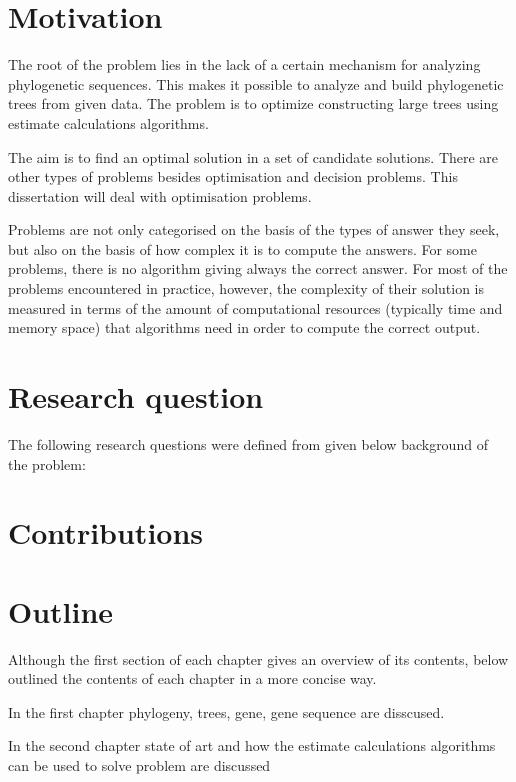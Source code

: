 \section*{Motivation}

The root of the problem lies in the lack of a certain mechanism 
for analyzing phylogenetic sequences. This makes it possible to 
analyze and build phylogenetic trees from given data. The problem 
is to optimize constructing large trees using estimate 
calculations algorithms.

The aim is to find an optimal solution in a set of candidate solutions. 
There are other types of problems besides optimisation and decision problems. 
This dissertation will deal with optimisation problems.

Problems are not only categorised on the basis of the types of 
answer they seek, but also on the basis of how complex it is to 
compute the answers. For some problems, there is no algorithm 
giving always the correct answer. For most of the problems 
encountered in practice, however, the complexity of their 
solution is measured in terms of the amount of computational 
resources (typically time and memory space) that algorithms need 
in order to compute the correct output.
 

\section*{Research question} 

The following research questions were defined from given below 
background of the problem:

 
\section*{Contributions}

\section*{Outline}

Although the first section of each chapter gives an overview of
its contents, below outlined the contents of each chapter in a more 
concise way.

In the first chapter phylogeny, trees, gene, gene sequence are disscused.

In the second chapter state of art and how the estimate calculations 
algorithms can be used to solve problem are discussed


